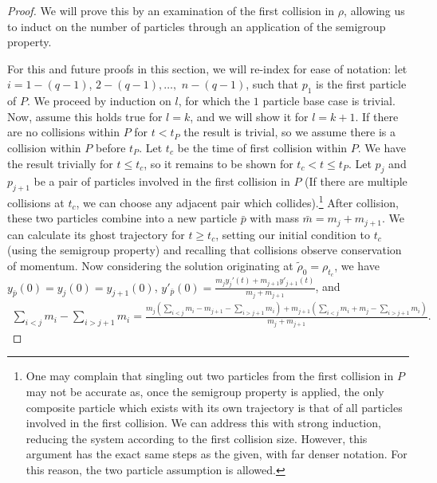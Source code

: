 \documentclass[11pt]{article}
\numberwithin{equation}{section}
\begin{document}
        \begin{proof}
            We will prove this by an examination of the first collision in $\rho$, allowing us to induct on the number of particles through an application of the semigroup property.
        
            For this and future proofs in this section, we will re-index for ease of notation: let $i=1-(q-1)$, $2-(q-1),\ldots,$ $n-(q-1)$, such that $p_1$ is the first particle of $P$. We proceed by induction on $l$, for which the $1$ particle base case is trivial. Now, assume this holds true for $l=k$, and we will show it for $l=k+1$. If there are no collisions within $P$ for $t < t_P$ the result is trivial, so we assume there is a collision within $P$ before $t_P$. Let $t_c$ be the time of first collision within $P$. We have the result trivially for $t \le t_c$, so it remains to be shown for $t_c < t \le t_P$. Let $p_j$ and $p_{j+1}$ be a pair of particles involved in the first collision in $P$ (If there are multiple collisions at $t_c$, we can choose any adjacent pair which collides).\footnote{One may complain that singling out two particles from the first collision in $P$ may not be accurate as, once the semigroup property is applied, the only composite particle which exists with its own trajectory is that of all particles involved in the first collision. We can address this with strong induction, reducing the system according to the first collision size. However, this argument has the exact same steps as the given, with far denser notation. For this reason, the two particle assumption is allowed.} After collision, these two particles combine into a new particle $\bar p$ with mass $\bar m = m_j + m_{j+1}$. We can calculate its ghost trajectory for $t \ge t_c$, setting our initial condition to $t_c$ (using the semigroup property) and recalling that collisions observe conservation of momentum. Now considering the solution originating at $\tilde{\rho}_0=\rho_{t_c}$, we have $y_{\bar{p}}(0) = y_j(0)=y_{j+1}(0)$, $y'_{\bar{p}}(0) = \frac{m_jy_j'(t) + m_{j+1}y'_{j+1}(t)}{m_j + m_{j+1}}$, and 
            \begin{align*}%
                \sum_{i<j}m_i-\sum_{i>j+1}m_i                =\frac{m_j\left(\sum_{i < j}m_i - m_{j+1}-\sum_{i > {j+1}}m_i\right)+m_{j+1}\left(\sum_{i < j}m_i + m_{j}-\sum_{i > {j+1}}m_i\right)}{m_j+m_{j+1}}.

\end{align*}
\end{proof}
\end{document}
